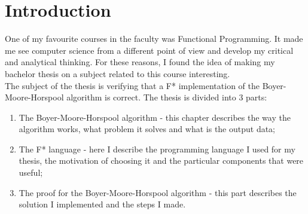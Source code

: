 \chapter*{Introduction} 

One of my favourite courses in the faculty was Functional Programming. It made me see computer science from a different point of view and develop my critical and analytical thinking. For these reasons, I found the idea of making my bachelor thesis on a subject related to this course interesting. \\
\indent The subject of the thesis is verifying that a F* implementation of the Boyer-Moore-Horspool algorithm is correct. The thesis is divided into \(3\) parts:
\begin{enumerate}
\item The Boyer-Moore-Horspool algorithm - this chapter describes the way the algorithm works, what problem it solves and what is the output data;
\item The F* language - here I describe the programming language I used for my thesis, the motivation of choosing it and the particular components that were useful;
\item The proof for the Boyer-Moore-Horspool algorithm - this part describes the solution I implemented and the steps I made.
\end{enumerate}